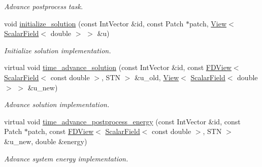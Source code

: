 \begin{DoxyCompactItemize}
\begin{DoxyCompactList}\small\item\em Advance postprocess task. \end{DoxyCompactList}\item 
void \hyperlink{classUintah_1_1PhaseField_1_1Benchmark01_a6789411f77db67cff05bb1b12e68b1bf}{initialize\+\_\+solution} (const Int\+Vector \&id, const Patch $\ast$patch, \hyperlink{namespaceUintah_1_1PhaseField_a59210a1e28eba254d428762c92ddeabb}{View}$<$ \hyperlink{structUintah_1_1PhaseField_1_1ScalarField}{Scalar\+Field}$<$ double $>$ $>$ \&u)
\begin{DoxyCompactList}\small\item\em Initialize solution implementation. \end{DoxyCompactList}\item 
virtual void \hyperlink{classUintah_1_1PhaseField_1_1Benchmark01_a91c1543ff7fa956471a391544a5d2a13}{time\+\_\+advance\+\_\+solution} (const Int\+Vector \&id, const \hyperlink{namespaceUintah_1_1PhaseField_a63032464b1cd54eaa53c1c29109746ac}{F\+D\+View}$<$ \hyperlink{structUintah_1_1PhaseField_1_1ScalarField}{Scalar\+Field}$<$ const double $>$, S\+TN $>$ \&u\+\_\+old, \hyperlink{namespaceUintah_1_1PhaseField_a59210a1e28eba254d428762c92ddeabb}{View}$<$ \hyperlink{structUintah_1_1PhaseField_1_1ScalarField}{Scalar\+Field}$<$ double $>$ $>$ \&u\+\_\+new)
\begin{DoxyCompactList}\small\item\em Advance solution implementation. \end{DoxyCompactList}\item 
virtual void \hyperlink{classUintah_1_1PhaseField_1_1Benchmark01_a6d7e02e56b5c5b618964b42d5d9de5ab}{time\+\_\+advance\+\_\+postprocess\+\_\+energy} (const Int\+Vector \&id, const Patch $\ast$patch, const \hyperlink{namespaceUintah_1_1PhaseField_a63032464b1cd54eaa53c1c29109746ac}{F\+D\+View}$<$ \hyperlink{structUintah_1_1PhaseField_1_1ScalarField}{Scalar\+Field}$<$ const double $>$, S\+TN $>$ \&u\+\_\+new, double \&energy)
\begin{DoxyCompactList}\small\item\em Advance system energy implementation. \end{DoxyCompactList}\end{DoxyCompactItemize}
